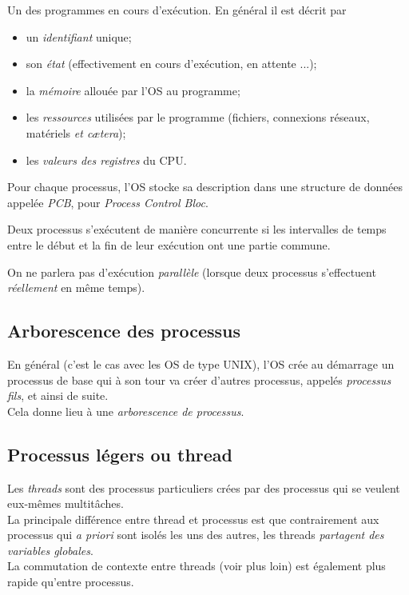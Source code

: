 \documentclass[10pt,firamath,cours]{nsi}
\begin{document}
\begin{definition}[ : processus]
    Un des programmes en cours d'exécution. En général il est décrit par
    \begin{itemize}
        \item un \textit{identifiant} unique;
        \item son \textit{état} (effectivement en cours d'exécution, en attente ...);
        \item la \textit{mémoire} allouée par l'OS au programme;
        \item les \textit{ressources} utilisées par le programme (fichiers, connexions réseaux, matériels \textit{et c\ae tera});
        \item les \textit{valeurs des registres} du CPU.
    \end{itemize}        
\end{definition}

\begin{definition}[ : PCB]
    Pour chaque processus, l'OS stocke sa description dans une structure de données appelée \textit{PCB}, pour \textit{Process Control Bloc}.    
\end{definition}

\begin{definition}
    Deux processus s'exécutent de manière concurrente si les intervalles de temps entre le début et la fin de leur exécution ont une partie commune.    
\end{definition}

On ne parlera pas d'exécution \textit{parallèle} (lorsque deux processus s'effectuent \textit{réellement} en même temps).


\subsection{Arborescence des processus}
En général (c'est le cas avec les OS de type \textsc{UNIX}), l'OS crée au démarrage un processus de base qui à son tour va créer d'autres processus, appelés \textit{processus fils}, et ainsi de suite.\\

Cela donne lieu à une \textit{arborescence de processus}.


\subsection{Processus légers ou thread}
Les \textit{threads} sont des processus particuliers crées par des processus qui se veulent eux-mêmes multitâches.\\
La principale différence entre thread et processus est que contrairement aux processus qui \textit{a priori} sont isolés les uns des autres, les threads \textit{partagent des variables globales}.\\
La commutation de contexte entre threads (voir plus loin) est également plus rapide qu'entre processus.\\
\end{document}
